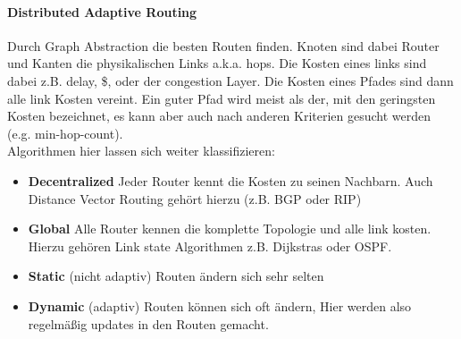 			\paragraph{Distributed Adaptive Routing}
				Durch Graph Abstraction die besten Routen finden. Knoten sind dabei Router und Kanten die physikalischen Links a.k.a. hops. Die Kosten eines links sind dabei z.B. delay, \$, oder der congestion Layer. Die Kosten eines Pfades sind dann alle link Kosten vereint. Ein guter Pfad wird meist als der, mit den geringsten Kosten bezeichnet, es kann aber auch nach anderen Kriterien gesucht werden (e.g. min-hop-count). \\
				Algorithmen hier lassen sich weiter klassifizieren: 
				\begin{itemize}
					\item \textbf{Decentralized}
						Jeder Router kennt die Kosten zu seinen Nachbarn. Auch Distance Vector Routing gehört hierzu (z.B. BGP oder RIP)
					\item \textbf{Global}
						Alle Router kennen die komplette Topologie und alle link kosten. Hierzu gehören Link state Algorithmen z.B. Dijkstras oder OSPF. 
					\item \textbf{Static} (nicht adaptiv)
						Routen ändern sich sehr selten
					\item \textbf{Dynamic} (adaptiv)
						Routen können sich oft ändern, Hier werden also regelmäßig updates in den Routen gemacht. 
				\end{itemize}
		
